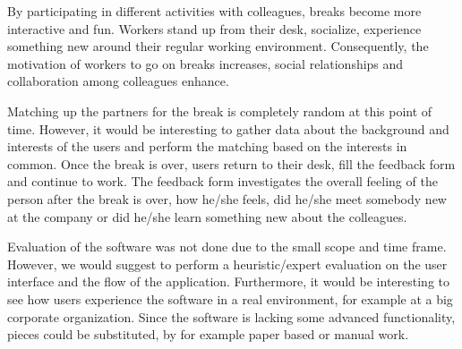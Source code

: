 By participating in different activities with colleagues, breaks become more interactive and fun. Workers stand up from their desk, socialize, experience something new around their regular working environment. Consequently, the motivation of workers to go on breaks increases, social relationships and collaboration among colleagues enhance. 

Matching up the partners for the break is completely random at this point of time. However, it would be interesting to gather data about the background and interests of the users and perform the matching based on the interests in common. Once the break is over, users return to their desk, fill the feedback form and continue to work. The feedback form investigates the overall feeling of the person after the break is over, how he/she feels, did he/she meet somebody new at the company or did he/she learn something new about the colleagues. 

Evaluation of the software was not done due to the small scope and time frame. However, we would suggest to perform a heuristic/expert evaluation on the user interface and the flow of the application. Furthermore, it would be interesting to see how users experience the software in a real environment, for example at a big corporate organization. Since the software is lacking some advanced functionality, pieces could be substituted, by for example paper based or manual work. 